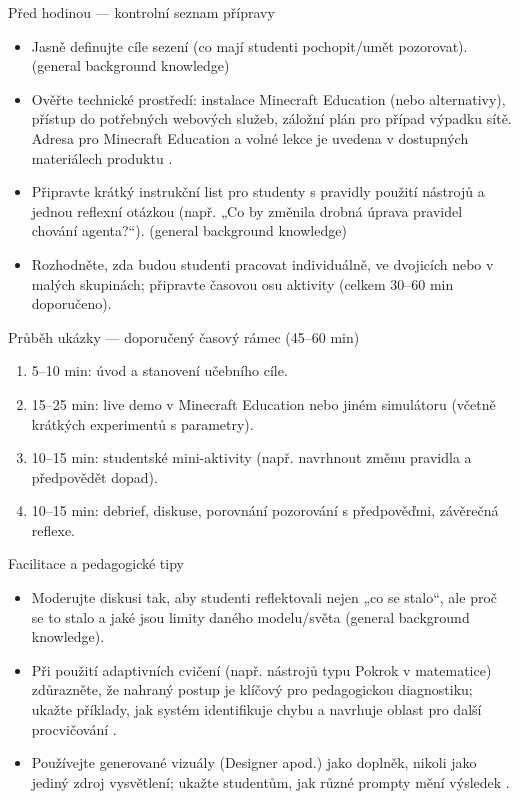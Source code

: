 \documentclass{report}%
\begin{document}
Před hodinou — kontrolní seznam přípravy
\begin{itemize}
  \item Jasně definujte cíle sezení (co mají studenti pochopit/umět pozorovat). (general background knowledge)
  \item Ověřte technické prostředí: instalace Minecraft Education (nebo alternativy), přístup do potřebných webových služeb, záložní plán pro případ výpadku sítě. Adresa pro Minecraft Education a volné lekce je uvedena v dostupných materiálech produktu \cite{kb_ai_101_tipu_pdf_04e4a115_page_15_2}.
  \item Připravte krátký instrukční list pro studenty s pravidly použití nástrojů a jednou reflexní otázkou (např. „Co by změnila drobná úprava pravidel chování agenta?“). (general background knowledge)
  \item Rozhodněte, zda budou studenti pracovat individuálně, ve dvojicích nebo v malých skupinách; připravte časovou osu aktivity (celkem 30--60 min doporučeno).
\end{itemize}

Průběh ukázky — doporučený časový rámec (45--60 min)
\begin{enumerate}
  \item 5--10 min: úvod a stanovení učebního cíle.
  \item 15--25 min: live demo v Minecraft Education nebo jiném simulátoru (včetně krátkých experimentů s parametry).
  \item 10--15 min: studentské mini-aktivity (např. navrhnout změnu pravidla a předpovědět dopad).
  \item 10--15 min: debrief, diskuse, porovnání pozorování s předpověďmi, závěrečná reflexe.
\end{enumerate}

Facilitace a pedagogické tipy
\begin{itemize}
  \item Moderujte diskusi tak, aby studenti reflektovali nejen „co se stalo“, ale proč se to stalo a jaké jsou limity daného modelu/světa (general background knowledge).
  \item Při použití adaptivních cvičení (např. nástrojů typu Pokrok v matematice) zdůrazněte, že nahraný postup je klíčový pro pedagogickou diagnostiku; ukažte příklady, jak systém identifikuje chybu a navrhuje oblast pro další procvičování \cite{kb_ai_101_tipu_pdf_04e4a115_page_8_1}.
  \item Používejte generované vizuály (Designer apod.) jako doplněk, nikoli jako jediný zdroj vysvětlení; ukažte studentům, jak různé prompty mění výsledek \cite{kb_ai_101_tipu_pdf_04e4a115_page_51_1}.
\end{itemize}
\end{document}
